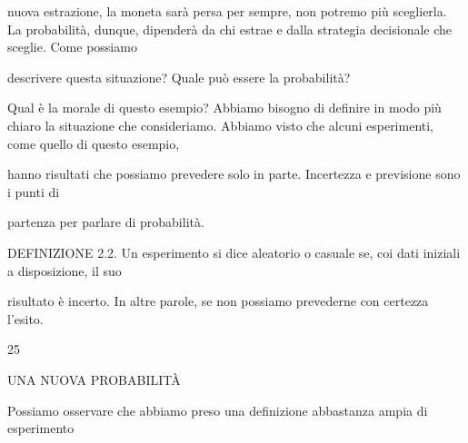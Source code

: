\documentclass[a4paper,portrait,12pt]{article}
\begin{document}
\begin{flushleft}
nuova estrazione, la moneta sar\`{a} persa per sempre, non potremo più sceglierla. La probabilit\`{a}, dunque, dipender\`{a} da chi estrae e dalla strategia decisionale che sceglie. Come possiamo
\end{flushleft}


\begin{flushleft}
descrivere questa situazione? Quale pu\`{o} essere la probabilit\`{a}?
\end{flushleft}


\begin{flushleft}
Qual \`{e} la morale di questo esempio? Abbiamo bisogno di definire in modo più chiaro la situazione che consideriamo. Abbiamo visto che alcuni esperimenti, come quello di questo esempio,
\end{flushleft}


\begin{flushleft}
hanno risultati che possiamo prevedere solo in parte. Incertezza e previsione sono i punti di
\end{flushleft}


\begin{flushleft}
partenza per parlare di probabilit\`{a}.
\end{flushleft}


\begin{flushleft}
DEFINIZIONE 2.2. Un esperimento si dice aleatorio o casuale se, coi dati iniziali a disposizione, il suo
\end{flushleft}


\begin{flushleft}
risultato \`{e} incerto. In altre parole, se non possiamo prevederne con certezza l'esito.
\end{flushleft}


25










\begin{flushleft}
UNA NUOVA PROBABILIT\`{A}
\end{flushleft}





\begin{flushleft}
Possiamo osservare che abbiamo preso una definizione abbastanza ampia di esperimento
\end{flushleft}
\end{document}
